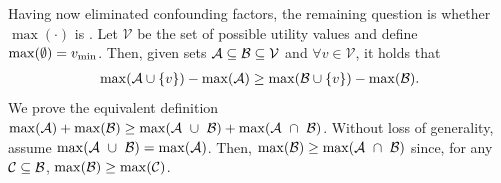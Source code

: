 


Having now eliminated confounding factors, the remaining question is whether \(\max(\cdot)\) is \SM{}.
% 
Let \(\mathcal{V}\) be the set of possible utility values and define \(\max(\emptyset) = v_{\min}\). 
% 
Then, given sets \(\mathcal{A} \subseteq \mathcal{B} \subseteq \mathcal{V}\) and \(\forall v \in \mathcal{V}\), it holds that
\begin{align}
\max(\mathcal{A} \cup \{v\}) - \max(\mathcal{A}) \ge \max(\mathcal{B} \cup \{v\}) - \max(\mathcal{B}).
\label{eq:max_submodularity}
\end{align}
We prove the equivalent definition \(\max(\mathcal{A}) + \max(\mathcal{B}) \ge \max(\mathcal{A}~\cup~\mathcal{B}) + \max(\mathcal{A}~\cap~\mathcal{B})\). Without loss of generality, assume \(\max(\mathcal{A}~\cup~\mathcal{B}) = \max(\mathcal{A})\). Then, \(\max(\mathcal{B}) \ge \max(\mathcal{A}~\cap~\mathcal{B})\) since, for any \(\mathcal{C} \subseteq \mathcal{B}\), \(\max(\mathcal{B}) \ge \max(\mathcal{C})\).

